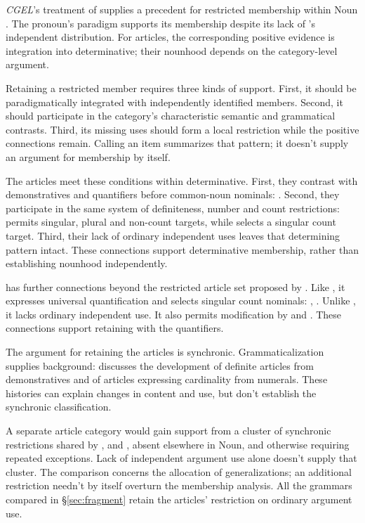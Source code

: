 \documentclass[12pt]{article}
\begin{document}
\textit{CGEL}'s treatment of  supplies a precedent for restricted membership within Noun \citep[470--471]{huddleston2002}. The pronoun's paradigm supports its membership despite its lack of 's independent distribution. For articles, the corresponding positive evidence is integration into determinative; their nounhood depends on the category-level argument.

Retaining a restricted member requires three kinds of support. First, it should be paradigmatically integrated with independently identified members. Second, it should participate in the category's characteristic semantic and grammatical contrasts. Third, its missing uses should form a local restriction while the positive connections remain. Calling an item  summarizes that pattern; it doesn't supply an argument for membership by itself.

The articles meet these conditions within determinative. First, they contrast with demonstratives and quantifiers before common-noun nominals: . Second, they participate in the same system of definiteness, number and count restrictions:  permits singular, plural and non-count targets, while  selects a singular count target. Third, their lack of ordinary independent uses leaves that determining pattern intact. These connections support determinative membership, rather than establishing nounhood independently.

 has further connections beyond the restricted article set proposed by \textcite{spinillo2004reconceptualising}. Like , it expresses universal quantification and selects singular count nominals: , . Unlike , it lacks ordinary independent use. It also permits modification by  and . These connections support retaining  with the quantifiers.

The argument for retaining the articles is synchronic. Grammaticalization supplies background: \textcite[331--336]{lyons1999} discusses the development of definite articles from demonstratives and of articles expressing cardinality from numerals. These histories can explain changes in content and use, but don't establish the synchronic classification.

A separate article category would gain support from a cluster of synchronic restrictions shared by ,  and , absent elsewhere in Noun, and otherwise requiring repeated exceptions. Lack of independent argument use alone doesn't supply that cluster. The comparison concerns the allocation of generalizations; an additional restriction needn't by itself overturn the membership analysis. All the grammars compared in §\ref{sec:fragment} retain the articles' restriction on ordinary argument use.
\end{document}
